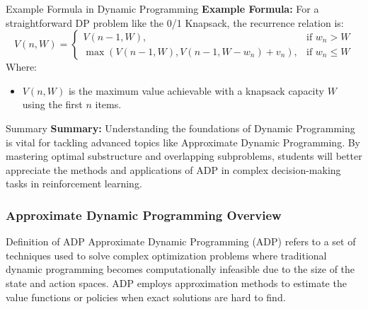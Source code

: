 \documentclass[aspectratio=169]{beamer}
\begin{document}
\begin{frame}[fragile]{Example Formula in Dynamic Programming}
    \textbf{Example Formula:}
    For a straightforward DP problem like the 0/1 Knapsack, the recurrence relation is:
    \begin{equation}
    V(n, W) = 
    \begin{cases} 
    V(n-1, W), & \text{if } w_n > W \\
    \max(V(n-1, W), V(n-1, W-w_n) + v_n), & \text{if } w_n \leq W 
    \end{cases}
    \end{equation}
    Where:
    \begin{itemize}
        \item \( V(n, W) \) is the maximum value achievable with a knapsack capacity \( W \) using the first \( n \) items.
    \end{itemize}
\end{frame}

\begin{frame}[fragile]{Summary}
    \textbf{Summary:}
    Understanding the foundations of Dynamic Programming is vital for tackling advanced topics like Approximate Dynamic Programming. By mastering optimal substructure and overlapping subproblems, students will better appreciate the methods and applications of ADP in complex decision-making tasks in reinforcement learning.
\end{frame}

\begin{frame}[fragile]
    \frametitle{Approximate Dynamic Programming Overview}
    \begin{block}{Definition of ADP}
        Approximate Dynamic Programming (ADP) refers to a set of techniques used to solve complex optimization problems where traditional dynamic programming becomes computationally infeasible due to the size of the state and action spaces. ADP employs approximation methods to estimate the value functions or policies when exact solutions are hard to find.
    \end{block}
\end{frame}
\end{document}
